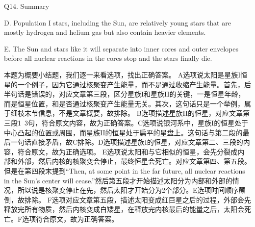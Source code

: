 \begin{blk}
    \begin{qst}
        Q14. Summary
    \end{qst}

    \begin{chc}
        D. Population I stars, including the Sun, are relatively young stars that are mostly hydrogen and helium gas but also contain heavier elements.

        E. The Sun and stars like it will separate into inner cores and outer envelopes before all nuclear reactions in the cores stop and the stars finally die.
    \end{chc}

    \begin{nlz}
        本题为概要小结题，我们逐一来看选项，找出正确答案。 A选项说太阳是星族I恒星的一个例子，因为它通过核聚变产生能量，而不是通过收缩产生能量。首先，后半句话是错误的，对应文章第三段，区分星族I和星族II的关键，一是恒星年龄，而是恒星位置，和是否通过核聚变产生能量无关。其次，这句话只是一个举例，属于细枝末节信息，不是文章概要，故排除。 B选项描述星族II的恒星，对应文章第三段1~3句，符合原文内容，故为正确答案。C选项说银河系中，星族I的恒星处于中心凸起的位置或周围，而星族II的恒星处于扁平的星盘上。这句话与第二段的最后一句话直接矛盾，故C排除。D选项描述星族I的恒星，对应文章第二、三段的内容，符合原文，故为正确选项。 E选项说太阳和与它相似的恒星，会先分裂成内部和外部，然后内核的核聚变会停止，最终恒星会死亡。对应文章第四、第五段。但是在第四段末提到“Then, at some point in the far future, all nuclear reactions in the Sun’s center will cease.”然后第五段才开始描述太阳分为内部和外部的情况，所以说是核聚变停止在先，然后太阳才开始分为2个部分。E选项时间顺序颠倒，故排除。   F选项对应文章第五段，描述太阳变成红巨星之后的过程，外部会先释放完所有物质，然后内核变成白矮星，在释放完内核最后的能量之后，太阳会死亡。F选项符合原文，故为正确答案。
    \end{nlz}
\end{blk}
